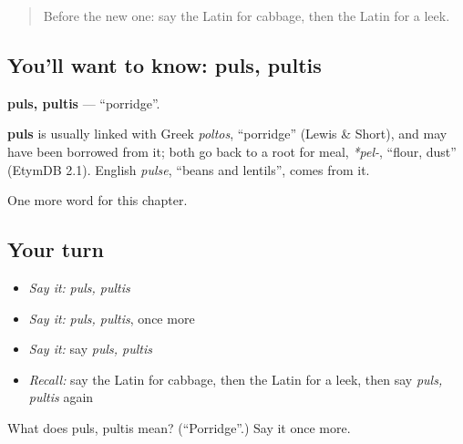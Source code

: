\label{lesson:LA-C279-puls}



\begin{quote}
Before the new one: say the Latin for cabbage, then the Latin for a leek.
\end{quote}

\subsection*{You'll want to know: puls, pultis}
\textbf{puls, pultis} — \textquotedblleft{}porridge\textquotedblright{}.

\begin{cousinweb}
\textbf{puls} is usually linked with Greek \emph{poltos}, \textquotedblleft{}porridge\textquotedblright{} (Lewis \& Short), and may have been borrowed from it; both go back to a root for meal, \emph{*pel-}, \textquotedblleft{}flour, dust\textquotedblright{} (EtymDB 2.1). English \emph{pulse}, \textquotedblleft{}beans and lentils\textquotedblright{}, comes from it.
\end{cousinweb}

\begin{grammarlens}[title={What you've built}]
One more word for this chapter.
\end{grammarlens}

\subsection*{Your turn}
\begin{itemize}
\raggedright
  \item \emph{Say it:} \emph{puls, pultis}
  \item \emph{Say it:} \emph{puls, pultis}, once more
  \item \emph{Say it:} say \emph{puls, pultis}
  \item \emph{Recall:} say the Latin for cabbage, then the Latin for a leek, then say \emph{puls, pultis} again
\end{itemize}

\begin{tcolorbox}[breakable,colback=teal!4,colframe=teal!35!black,title={Before you move on}]
What does puls, pultis mean? (\textquotedblleft{}Porridge\textquotedblright{}.) Say it once more.
\end{tcolorbox}

